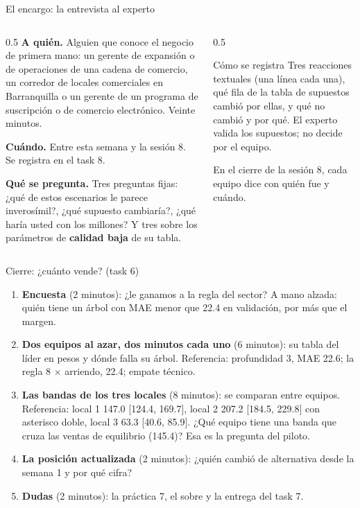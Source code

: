 \documentclass{beamer}
\begin{document}
\begin{frame}{El encargo: la entrevista al experto}
\begin{columns}[T]
\begin{column}{0.5\textwidth}
\small
\textbf{A quién.} Alguien que conoce el negocio de primera mano: un gerente de expansión o de operaciones de una cadena de comercio, un corredor de locales comerciales en Barranquilla o un gerente de un programa de suscripción o de comercio electrónico. Veinte minutos.

\medskip
\textbf{Cuándo.} Entre esta semana y la sesión 8. Se registra en el task 8.

\medskip
\textbf{Qué se pregunta.} Tres preguntas fijas: ¿qué de estos escenarios le parece inverosímil?, ¿qué supuesto cambiaría?, ¿qué haría usted con los  millones? Y tres sobre los parámetros de \textbf{calidad baja} de su tabla.
\end{column}
\begin{column}{0.5\textwidth}
\begin{block}{Cómo se registra}
Tres reacciones textuales (una línea cada una), qué fila de la tabla de supuestos cambió por ellas, y qué no cambió y por qué. El experto valida los supuestos; no decide por el equipo.
\end{block}
\small En el cierre de la sesión 8, cada equipo dice con quién fue y cuándo.
\end{column}
\end{columns}
\end{frame}

\begin{frame}{Cierre: ¿cuánto vende? (task 6)}
\begin{enumerate}\itemsep6pt
  \item \textbf{Encuesta} (2 minutos): ¿le ganamos a la regla del sector? A mano alzada: quién tiene un árbol con MAE menor que 22.4 en validación, por más que el margen.
  \item \textbf{Dos equipos al azar, dos minutos cada uno} (6 minutos): su tabla del líder en pesos y dónde falla su árbol. Referencia: profundidad 3, MAE 22.6; la regla 8 $\times$ arriendo, 22.4; empate técnico.
  \item \textbf{Las bandas de los tres locales} (8 minutos): se comparan entre equipos. Referencia: local 1 147.0 [124.4, 169.7], local 2 207.2 [184.5, 229.8] con asterisco doble, local 3 63.3 [40.6, 85.9]. ¿Qué equipo tiene una banda que cruza las ventas de equilibrio (145.4)? Esa es la pregunta del piloto.
  \item \textbf{La posición actualizada} (2 minutos): ¿quién cambió de alternativa desde la semana 1 y por qué cifra?
  \item \textbf{Dudas} (2 minutos): la práctica 7, el sobre y la entrega del task 7.
\end{enumerate}
\end{frame}
\end{document}
